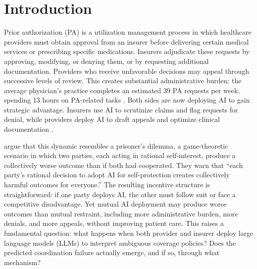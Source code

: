\section{Introduction}
\label{sec:introduction}
Prior authorization (PA) is a utilization management process in which healthcare providers must obtain approval from an insurer before delivering certain medical services or prescribing specific medications. Insurers adjudicate these requests by approving, modifying, or denying them, or by requesting additional documentation. Providers who receive unfavorable decisions may appeal through successive levels of review. This creates substantial administrative burden: the average physician's practice completes an estimated 39 PA requests per week, spending 13 hours on PA-related tasks \citep{ama2024pa}. Both sides are now deploying AI to gain strategic advantage. Insurers use AI to scrutinize claims and flag requests for denial, while providers deploy AI to draft appeals and optimize clinical documentation \citep{williams2024hfma}.

\citet{moritz2025lancet} argue that this dynamic resembles a prisoner's dilemma, a game-theoretic scenario in which two parties, each acting in rational self-interest, produce a collectively worse outcome than if both had cooperated. They warn that ``each party's rational decision to adopt AI for self-protection creates collectively harmful outcomes for everyone.'' The resulting incentive structure is straightforward: if one party deploys AI, the other must follow suit or face a competitive disadvantage. Yet mutual AI deployment may produce worse outcomes than mutual restraint, including more administrative burden, more denials, and more appeals, without improving patient care. This raises a fundamental question: what happens when both provider and insurer deploy large language models (LLMs) to interpret ambiguous coverage policies? Does the predicted coordination failure actually emerge, and if so, through what mechanism?

